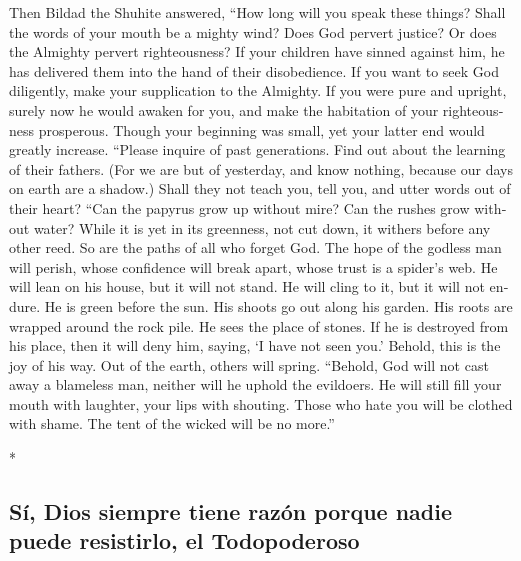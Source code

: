 \begin{paracol}{2}
\begin{otherlanguage}{english}
 Then Bildad the Shuhite answered,  ``How
long will you speak these things? Shall the words of your mouth be a
mighty wind?  Does God pervert justice? Or does the
Almighty pervert righteousness?  If your children have
sinned against him, he has delivered them into the hand of their
disobedience.  If you want to seek God diligently, make
your supplication to the Almighty.  If you were pure and
upright, surely now he would awaken for you, and make the habitation of
your righteousness prosperous.  Though your beginning was
small, yet your latter end would greatly increase. 
``Please inquire of past generations. Find out about the learning of
their fathers.  (For we are but of yesterday, and know
nothing, because our days on earth are a shadow.)  Shall
they not teach you, tell you, and utter words out of their heart?
 ``Can the papyrus grow up without mire? Can the rushes
grow without water?  While it is yet in its greenness,
not cut down, it withers before any other reed.  So are
the paths of all who forget God. The hope of the godless man will
perish,  whose confidence will break apart, whose trust
is a spider's web.  He will lean on his house, but it
will not stand. He will cling to it, but it will not endure.
 He is green before the sun. His shoots go out along his
garden.  His roots are wrapped around the rock pile. He
sees the place of stones.  If he is destroyed from his
place, then it will deny him, saying, `I have not seen you.'
 Behold, this is the joy of his way. Out of the earth,
others will spring.  ``Behold, God will not cast away a
blameless man, neither will he uphold the evildoers.  He
will still fill your mouth with laughter, your lips with shouting.
 Those who hate you will be clothed with shame. The tent
of the wicked will be no more.''

\end{otherlanguage}

\switchcolumn[0]*

\hypertarget{suxed-dios-siempre-tiene-razuxf3n-porque-nadie-puede-resistirlo-el-todopoderoso}{%
\subsection{Sí, Dios siempre tiene razón porque nadie puede resistirlo,
el
Todopoderoso}\label{suxed-dios-siempre-tiene-razuxf3n-porque-nadie-puede-resistirlo-el-todopoderoso}}


\end{paracol}
